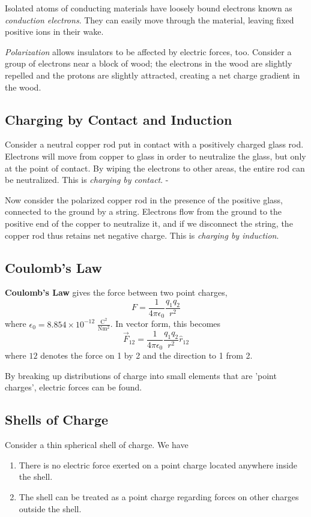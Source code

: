 \documentclass[../PhysicsFormulae.tex]{subfiles}
\begin{document}
Isolated atoms of conducting materials have loosely bound electrons known as \textit{conduction electrons}. They can easily move through the material, leaving fixed positive ions in their wake. \bigskip

\textit{Polarization} allows insulators to be affected by electric forces, too. Consider a group of electrons near a block of wood; the electrons in the wood are slightly repelled and the protons are slightly attracted, creating a net charge gradient in the wood. 

\subsection{Charging by Contact and Induction}
Consider a neutral copper rod put in contact with a positively charged glass rod. Electrons will move from copper to glass in order to neutralize the glass, but only at the point of contact. By wiping the electrons to other areas, the entire rod can be neutralized. This is \textit{charging by contact}. \bigskip-

Now consider the polarized copper rod in the presence of the positive glass, connected to the ground by a string. Electrons flow from the ground to the positive end of the copper to neutralize it, and if we disconnect the string, the copper rod thus retains net negative charge. This is \textit{charging by induction}. 

\subsection{Coulomb's Law}
\textbf{Coulomb's Law} gives the force between two point charges, 
\[ F = \frac{1}{4\pi \epsilon_0}\frac{q_1 q_2}{r^2} \]
where $\epsilon_0 = 8.854 \times 10^{-12} \; \mathrm{\frac{C^2}{Nm^2}}$. In vector form, this becomes
\[ \vec{F}_{12} = \frac{1}{4\pi \epsilon_0}\frac{q_1 q_2}{r^2}\hat{r}_{12} \]
where $12$ denotes the force on 1 by 2 and the direction to 1 from 2. 

By breaking up distributions of charge into small elements that are 'point charges', electric forces can be found. 

\subsection{Shells of Charge}
Consider a thin spherical shell of charge. We have 
\begin{enumerate}
	\item There is no electric force exerted on a point charge located anywhere inside the shell. 
	\item The shell can be treated as a point charge regarding forces on other charges outside the shell.
\end{enumerate}
\end{document}
